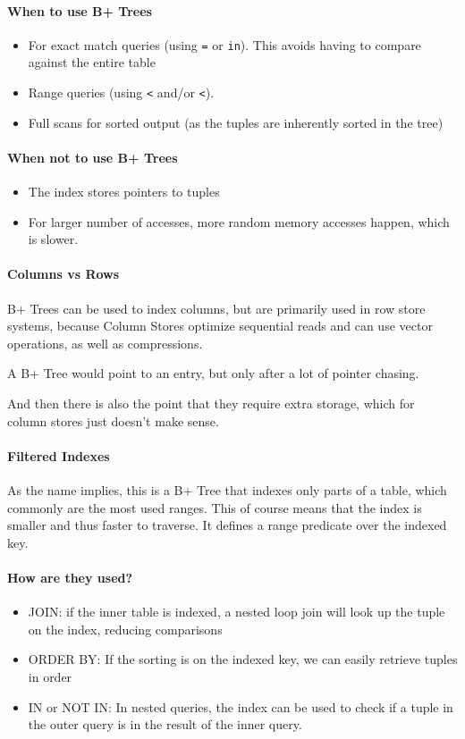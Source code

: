 \paragraph{When to use B+ Trees}
\begin{itemize}
    \item For exact match queries (using \texttt{=} or \texttt{in}). This avoids having to compare against the entire table
    \item Range queries (using \texttt{<} and/or \texttt{<}).
    \item Full scans for sorted output (as the tuples are inherently sorted in the tree)
\end{itemize}


\paragraph{When not to use B+ Trees}
\begin{itemize}
    \item The index stores pointers to tuples
    \item For larger number of accesses, more random memory accesses happen, which is slower.
\end{itemize}


\paragraph{Columns vs Rows}
B+ Trees can be used to index columns, but are primarily used in row store systems,
because Column Stores optimize sequential reads and can use vector operations, as well as compressions.

A B+ Tree would point to an entry, but only after a lot of pointer chasing.

And then there is also the point that they require extra storage, which for column stores just doesn't make sense.



\paragraph{Filtered Indexes}
As the name implies, this is a B+ Tree that indexes only parts of a table, which commonly are the most used ranges.
This of course means that the index is smaller and thus faster to traverse.
It defines a range predicate over the indexed key.


\paragraph{How are they used?}
\begin{itemize}
    \item JOIN: if the inner table is indexed, a nested loop join will look up the tuple on the index, reducing comparisons
    \item ORDER BY: If the sorting is on the indexed key, we can easily retrieve tuples in order
    \item IN or NOT IN: In nested queries, the index can be used to check if a tuple in the outer query is in the result of the inner query.
\end{itemize}
